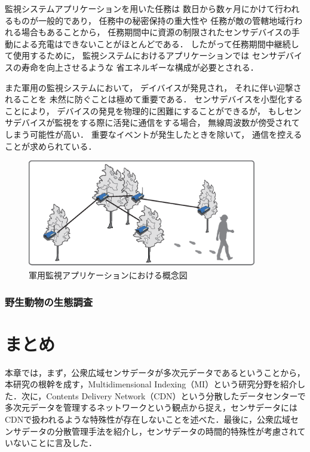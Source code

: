 監視システムアプリケーションを用いた任務は
数日から数ヶ月にかけて行われるものが一般的であり，
任務中の秘密保持の重大性や
任務が敵の管轄地域行われる場合もあることから，
任務期間中に資源の制限されたセンサデバイスの手動による充電はできないことがほとんどである．
したがって任務期間中継続して使用するために，
監視システムにおけるアプリケーションでは
センサデバイスの寿命を向上させるような
省エネルギーな構成が必要とされる．

また軍用の監視システムにおいて，
デイバイスが発見され，
それに伴い迎撃されることを
未然に防ぐことは極めて重要である．
センサデバイスを小型化することにより，
デバイスの発見を物理的に困難にすることができるが，
もしセンサデバイスが監視をする際に活発に通信をする場合，
無線周波数が傍受されてしまう可能性が高い．
重要なイベントが発生したときを除いて，
通信を控えることが求められている．



\begin{figure}[htbp]
 \begin{center}
  \includegraphics[width=100mm]{./images/surveillance_system.eps}
 \end{center}
 \caption{軍用監視アプリケーションにおける概念図}
 \label{fig:surveillance_system}
\end{figure}


\subsubsection{野生動物の生態調査}

\vspace{0.5em}




\section{まとめ}
本章では，まず，公衆広域センサデータが多次元データであるということから，本研究の根幹を成す，Multidimensional Indexing（MI）という研究分野を紹介した．次に，Contents Delivery Network（CDN）という分散したデータセンターで多次元データを管理するネットワークという観点から捉え，センサデータにはCDNで扱われるような特殊性が存在しないことを述べた．最後に，公衆広域センサデータの分散管理手法を紹介し，センサデータの時間的特殊性が考慮されていないことに言及した．
